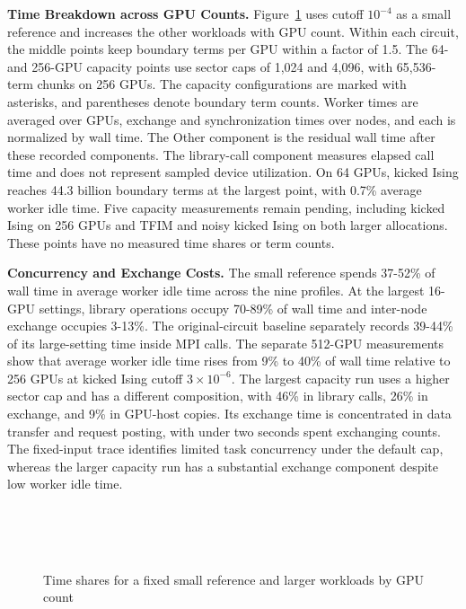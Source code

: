 \noindent\textbf{Time Breakdown across GPU Counts.}
Figure~\ref{fig:runtime} uses cutoff $10^{-4}$ as a small reference and increases the other workloads with GPU count.
Within each circuit, the middle points keep boundary terms per GPU within a factor of 1.5.
The 64- and 256-GPU capacity points use sector caps of 1,024 and 4,096, with 65,536-term chunks on 256 GPUs.
The capacity configurations are marked with asterisks, and parentheses denote boundary term counts.
Worker times are averaged over GPUs, exchange and synchronization times over nodes, and each is normalized by wall time.
The Other component is the residual wall time after these recorded components.
The library-call component measures elapsed call time and does not represent sampled device utilization.
On 64 GPUs, kicked Ising reaches 44.3 billion boundary terms at the largest point, with 0.7\% average worker idle time.
Five capacity measurements remain pending, including kicked Ising on 256 GPUs and TFIM and noisy kicked Ising on both larger allocations.
These points have no measured time shares or term counts.

\noindent\textbf{Concurrency and Exchange Costs.}
The small reference spends 37-52\% of wall time in average worker idle time across the nine profiles.
At the largest 16-GPU settings, library operations occupy 70-89\% of wall time and inter-node exchange occupies 3-13\%.
The original-circuit \cuPP baseline separately records 39-44\% of its large-setting time inside MPI calls.
The separate 512-GPU measurements show that average worker idle time rises from 9\% to 40\% of wall time relative to 256 GPUs at kicked Ising cutoff $3\times10^{-6}$.
The largest capacity run uses a higher sector cap and has a different composition, with 46\% in library calls, 26\% in exchange, and 9\% in GPU-host copies.
Its exchange time is concentrated in data transfer and request posting, with under two seconds spent exchanging counts.
The fixed-input trace identifies limited task concurrency under the default cap, whereas the larger capacity run has a substantial exchange component despite low worker idle time.

\begin{figure}[tp]
\centering
{}\\[-2pt]
\hfill
{}\hfill
{}\\[4pt]
\hfill
{}\hfill
{}\\[4pt]
\hfill
{}\hfill
{}
\caption{Time shares for a fixed small reference and larger workloads by GPU count}
\label{fig:runtime}
\end{figure}

